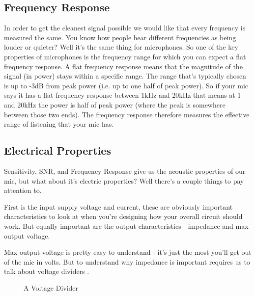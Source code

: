 \documentclass[10pt,a5paper]{book}
\begin{document}
\subsection{Frequency Response}
In order to get the cleanest signal possible we would like that every frequency is measured the same. You know how people hear different frequencies as being louder or quieter? Well it's the same thing for microphones. So one of the key properties of microphones is the frequency range for which you can expect a flat frequency response. A flat frequency response means that the magnitude of the signal (in power) stays within a specific range. The range that's typically chosen is up to -3dB from peak power (i.e. up to one half of peak power). So if your mic says it has a flat frequency response between 1kHz and 20kHz that means at 1 and 20kHz the power is half of peak power (where the peak is somewhere between those two ends). The frequency response therefore measures the effective range of listening that your mic has. 

\subsection{Electrical Properties}
Sensitivity, SNR, and Frequency Response give us the acoustic properties of our mic, but what about it's electric properties? Well there's a couple things to pay attention to.

First is the input supply voltage and current, these are obviously important characteristics to look at when you're designing how your overall circuit should work. But equally important are the output characteristics - impedance and max output voltage. 

Max output voltage is pretty easy to understand - it's just the most you'll get out of the mic in volts. But to understand why impedance is important requires us to talk about voltage dividers \cite{artofelectronics}.

\begin{figure}[!htb]
\caption{\label{fig:my-label} A Voltage Divider}
\end{figure}
\end{document}
